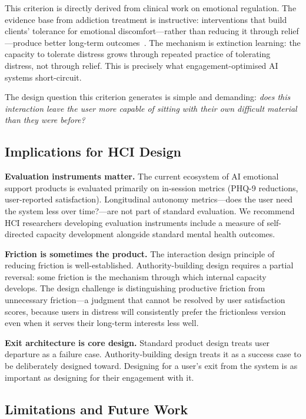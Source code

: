 \documentclass[sigchi,review,anonymous]{acmart}
\begin{document}
This criterion is directly derived from clinical work on emotional regulation. The evidence
base from addiction treatment is instructive: interventions that build clients' tolerance for
emotional discomfort---rather than reducing it through relief---produce better long-term
outcomes~\cite{blakey2016}. The mechanism is extinction learning: the capacity to tolerate
distress grows through repeated practice of tolerating distress, not through relief. This is
precisely what engagement-optimised AI systems short-circuit.

The design question this criterion generates is simple and demanding: \emph{does this
interaction leave the user more capable of sitting with their own difficult material than they
were before?}

\subsection{Implications for HCI Design}

\textbf{Evaluation instruments matter.} The current ecosystem of AI emotional support products
is evaluated primarily on in-session metrics (PHQ-9 reductions, user-reported satisfaction).
Longitudinal autonomy metrics---does the user need the system less over time?---are not part
of standard evaluation. We recommend HCI researchers developing evaluation instruments
include a measure of self-directed capacity development alongside standard mental health
outcomes.

\textbf{Friction is sometimes the product.} The interaction design principle of reducing
friction is well-established. Authority-building design requires a partial reversal: some
friction is the mechanism through which internal capacity develops. The design challenge is
distinguishing productive friction from unnecessary friction---a judgment that cannot be
resolved by user satisfaction scores, because users in distress will consistently prefer the
frictionless version even when it serves their long-term interests less well.

\textbf{Exit architecture is core design.} Standard product design treats user departure as a
failure case. Authority-building design treats it as a success case to be deliberately designed
toward. Designing for a user's exit from the system is as important as designing for their
engagement with it.

\subsection{Limitations and Future Work}
\end{document}
